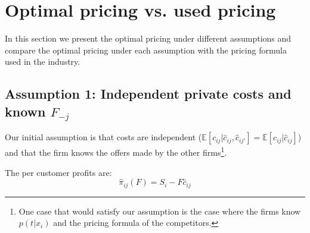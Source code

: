 \documentclass[12pt]{article}
\theoremstyle{plain}
\theoremstyle{plain}
\begin{document}
\section{Optimal pricing vs. used pricing}\label{sec:suboptimality}

In this section we present the optimal pricing under different assumptions and compare the optimal pricing under each assumption with the pricing formula used in the industry. 


\subsection{Assumption 1: Independent private costs and known $F_{-j}$ }\label{sec:independent_private}

Our initial assumption is that costs are independent ($\mathbb{E}[c_{ij}|\hat{c}_{ij}, \hat{c}_{ij'}] = \mathbb{E}[c_{ij}|\hat{c}_{ij}]$) and that the firm knows the offers made by the other firms\footnote{One case that would satisfy our assumption is the case where the firms know $p(t|x_i)$ and the pricing formula of the competitors.}. 



The per customer profits are:  
\begin{equation}\label{eq:profit3}
\hat{\pi}_{ij}(F)= S_{i}-F\hat{c}_{ij}
\end{equation}
\end{document}
